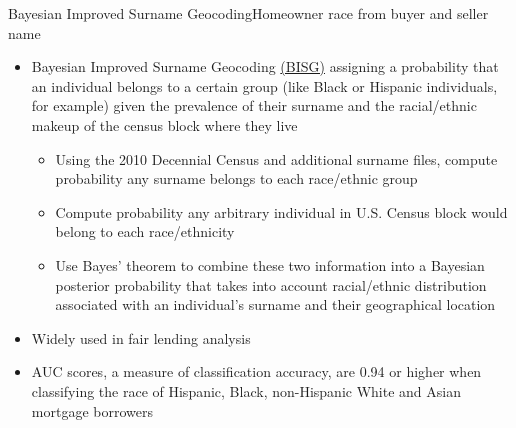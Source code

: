 \documentclass[aspectratio=169,t,11pt,table]{beamer}
\begin{document}
\begingroup
\scriptsize
\begin{frame}{Bayesian Improved Surname Geocoding}{Homeowner race from buyer and seller name}\label{racedetails}
\begin{itemize}
\item Bayesian Improved Surname Geocoding \href{https://www.consumerfinance.gov/data-research/research-reports/using-publicly-available-information-to-proxy-for-unidentified-race-and-ethnicity/}{(BISG)} assigning a probability that an individual belongs to a certain group (like Black or Hispanic individuals, for example) given the prevalence of their surname and the racial/ethnic makeup of the census block where they live  
\begin{itemize}
\scriptsize
    \item Using the 2010 Decennial Census and additional surname files, compute probability any surname belongs to each race/ethnic group
    \item Compute probability any arbitrary individual in U.S. Census block would belong to each race/ethnicity
    \item Use Bayes' theorem to combine these two information into a Bayesian posterior probability that takes into account racial/ethnic distribution associated with an individual's surname and their geographical location
\end{itemize}
\item Widely used in fair lending analysis 
\item AUC scores, a measure of classification accuracy, are 0.94 or higher when classifying the race of Hispanic, Black, non-Hispanic White and Asian mortgage borrowers
\end{itemize}  
\end{frame}
\endgroup
\end{document}
